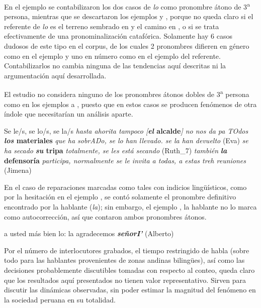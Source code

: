 \documentclass[output=paper]{../langscibook}
\begin{document}
En el ejemplo  se contabilizaron los dos casos de \textit{lo} como pronombre átono de 3\textsuperscript{a} persona, mientras que se descartaron los ejemplos  y , porque no queda claro si el referente de \textit{lo} es el terreno sembrado en  y el camino en , o si se trata efectivamente de una pronominalización catafórica. Solamente hay 6 casos dudosos de este tipo en el corpus, de los cuales 2 pronombres difieren en género como en el ejemplo  y uno en número como en el ejemplo  del referente. Contabilizarlos no cambia ninguna de las tendencias aquí descritas ni la argumentación aquí desarrollada.

El estudio no considera ninguno de los pronombres átonos dobles de 3\textsuperscript{a} persona como en los ejemplos  a  , puesto que en estos casos se producen fenómenos de otra índole  \citep{Fernández-Ordóñez1999} que necesitarían un análisis aparte.


\ea\label{ex:mick:3} Se le/s, se lo/s, se la/s
\ea\label{ex:mick:3a} \textit{hasta ahorita tampoco [}\textbf{\textit{el} \textbf{alcalde}}\textit{] no nos da pa TOdos} \textbf{\textit{los} \textbf{materiales}} \textit{que ha sobrADo, se lo han llevado. se la han devuelto} (Eva)
\ex\label{ex:mick:3b} \textit{se ha secado} \textbf{\textit{su} \textbf{tripa}} \textit{totalmente, se les está secando} (Ruth\_7)
\ex\label{ex:mick:3c} \textit{también} \textbf{\textit{la} \textbf{defensoría}} \textit{participa, normalmente se le invita a todas, a estas treh reuniones} (Jimena)
\z
\z

En el caso de reparaciones marcadas como tales con indicios lingüísticos, como por la hesitación en el ejemplo , se contó solamente el pronombre definitivo encontrado por la hablante (\textit{la}); sin embargo, el ejemplo , la hablante no lo marca como autocorrección, así que contaron ambos pronombres átonos.


\ea\label{ex:mick:4} {a usted más bien lo: la agradecemos} \textbf{\textit{señorI'}} (Alberto)
\z

Por el número de interlocutores grabados, el tiempo restringido de habla (sobre todo para las hablantes provenientes de zonas andinas bilingües), así como las decisiones probablemente discutibles tomadas con respecto al conteo, queda claro que los resultados aquí presentados no tienen valor representativo. Sirven para discutir las dinámicas observadas, sin poder estimar la magnitud del fenómeno en la sociedad peruana en su totalidad.
\end{document}
